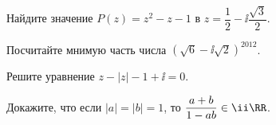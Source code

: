 %
%


\begin{problems}

\item
Найдите значение $P(z) = z^2 - z - 1$ в
$z = \dfrac{1}{2} - \ii \dfrac{\sqrt{3}}{2}$.

\item
Посчитайте мнимую часть числа
$\left(\sqrt{6} - \ii \sqrt{2}\right)^{2012}$.

\item
Решите уравнение
$z - |z| - 1 + \ii = 0$.

\item
Докажите, что если
$|a| = |b| = 1$,
то
$\dfrac{a + b}{1 - a b} \in \ii \RR$.

\end{problems}

